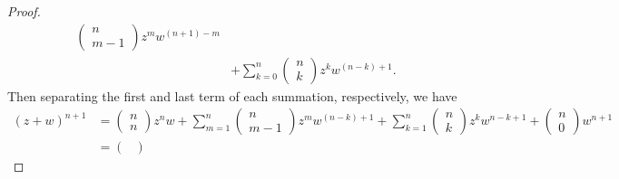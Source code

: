 \documentclass[a4paper]{article}
\begin{document}
\begin{enumerate}
\begin{proof}
\begin{align*}
\begin{pmatrix}
                                                       n \\
                                                       m-1
                                                      \end{pmatrix}  z^{m} w^{(n+1) -m} \\
                                                      &+ \sum_{ k=0  }^{ n } \begin{pmatrix} 
                                                                 n \\
                                                                 k 
                                                                \end{pmatrix}  z^{k} w^{(n-k) + 1}.
        \end{align*}
       Then separating the first and last term of each summation, respectively, we have
        \begin{align*}
            (z + w)^{n+1} &=  \begin{pmatrix} 
                                               n \\
                                               n 
                                              \end{pmatrix} z^{n} w + \sum_{ m=1  }^{ n } \begin{pmatrix} 
                                                         n \\
                                                         m-1
                                                     \end{pmatrix} z^{m} w^{(n-k)+1} + \sum_{ k=1 }^{ n } \begin{pmatrix} 
                                                                n \\
                                                                k 
                                                               \end{pmatrix}  z^{k } w^{n -k  + 1}  +  \begin{pmatrix} 
                                                                n \\
                                                                0  
                                                            \end{pmatrix} w^{n+1} \\
                                                            &=  \begin{pmatrix} 

\end{pmatrix}
\end{align*}
\end{proof}
\end{enumerate}
\end{document}
